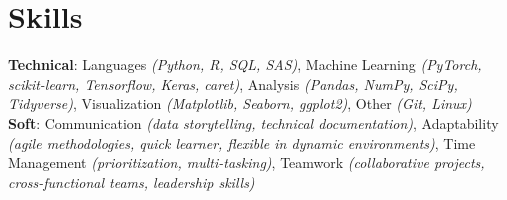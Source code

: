 \documentclass[letterpaper,11pt]{article}
\begin{document}
\section{Skills}
 \begin{itemize}[leftmargin=0.15in, label={}]
    \small{\item{
     \textbf{Technical}{: Languages \textit{(Python, R, SQL, SAS)}, Machine Learning \textit{(PyTorch, scikit-learn, Tensorflow, Keras, caret)}, Analysis \textit{(Pandas, NumPy, SciPy, Tidyverse)}, Visualization \textit{(Matplotlib, Seaborn, ggplot2)}, Other \textit{(Git, Linux)}} \\
     \textbf{Soft}{: Communication \textit{(data storytelling, technical documentation)}, Adaptability \textit{(agile methodologies, quick learner, flexible in dynamic environments)}, Time Management \textit{(prioritization, multi-tasking)}, Teamwork \textit{(collaborative projects, cross-functional teams, leadership skills)}}  \\
    }}
 \end{itemize}

% 
\end{document}
